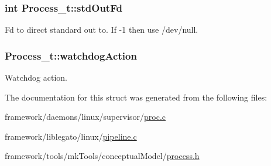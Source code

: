 \subsubsection[{\texorpdfstring{std\+Out\+Fd}{stdOutFd}}]{\setlength{\rightskip}{0pt plus 5cm}int Process\+\_\+t\+::std\+Out\+Fd}\hypertarget{struct_process__t_a5dd485ca4aee5af5845e511341ca167f}{}\label{struct_process__t_a5dd485ca4aee5af5845e511341ca167f}


Fd to direct standard out to. If -\/1 then use /dev/null. 

\subsubsection[{\texorpdfstring{watchdog\+Action}{watchdogAction}}]{ Process\+\_\+t\+::watchdog\+Action}\hypertarget{struct_process__t_a90a4e6ee6ab1082b4de0e1bfa5d3a31e}{}\label{struct_process__t_a90a4e6ee6ab1082b4de0e1bfa5d3a31e}


Watchdog action. 



The documentation for this struct was generated from the following files\+:\begin{DoxyCompactItemize}
\item 
framework/daemons/linux/supervisor/\hyperlink{proc_8c}{proc.\+c}\item 
framework/liblegato/linux/\hyperlink{pipeline_8c}{pipeline.\+c}\item 
framework/tools/mk\+Tools/conceptual\+Model/\hyperlink{process_8h}{process.\+h}\end{DoxyCompactItemize}
